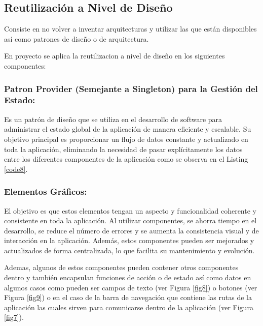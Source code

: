 \documentclass[runningheads]{llncs}
\begin{document}
\subsection*{Reutilización a Nivel de Diseño}
Consiste en no volver a inventar arquitecturas y utilizar las que están disponibles así como patrones de diseño o de arquitectura.

En proyecto se aplica la reutilizacion a nivel de diseño en los siguientes componentes:

\subsubsection*{Patron Provider (Semejante a Singleton) para la Gestión del Estado:}
Es un patrón de diseño que se utiliza en el desarrollo de software para administrar el estado global de la aplicación de manera eficiente y escalable. Su objetivo principal es proporcionar un flujo de datos constante y actualizado en toda la aplicación, eliminando la necesidad de pasar explícitamente los datos entre los diferentes componentes de la aplicación como se observa en el Listing \ref{code8}. 


\subsubsection*{Elementos Gráficos: }
El objetivo es que estos elementos tengan un aspecto y funcionalidad coherente y consistente en toda la aplicación. Al utilizar componentes, se ahorra tiempo en el desarrollo, se reduce el número de errores y se aumenta la consistencia visual y de interacción en la aplicación. Además, estos componentes pueden ser mejorados y actualizados de forma centralizada, lo que facilita su mantenimiento y evolución.

Ademas, algunos de estos componentes pueden contener otros componentes dentro y también encapsulan funciones de acción o de estado así como datos en algunos casos como pueden ser campos de texto (ver Figura \ref{fig8}) o botones (ver Figura \ref{fig9}) o en el caso de la barra de navegación que contiene las rutas de la aplicación las cuales sirven para comunicarse dentro de la aplicación (ver Figura \ref{fig7}).
\end{document}
